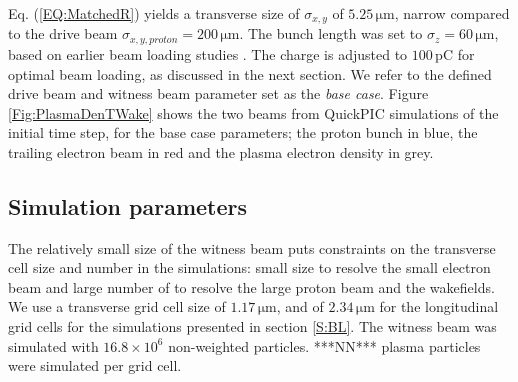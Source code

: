 \documentclass[aps,prstab,reprint,amsmath,amssymb,groupedaddress,onecolumn]{revtex4-1}
\newcommand{\unit}[1]{\,\mathrm{#1}}
\newcommand{\nexp}[1]{\times 10^{#1}}
\begin{document}
Eq. (\ref{EQ:MatchedR}) yields a transverse size of $\sigma_{x,y}$ of $5.25\unit{\mu m}$, narrow compared to the drive beam $\sigma_{x,y,proton} = 200\unit{\mu m}$.   The bunch length was set to $\sigma_{z}=60\unit{\mu m}$, based on earlier %
beam loading studies \cite{berglyd_olsen:2016}.  The charge %
is adjusted to $100\unit{pC}$ for optimal beam loading, as discussed in the next section. We refer to the defined drive beam and witness beam parameter set as the \emph{base case}.  
Figure \ref{Fig:PlasmaDenTWake} shows the two beams from QuickPIC simulations of the initial time step, for the base case parameters; the proton bunch in blue, the trailing electron beam in red and the plasma electron density in grey. 



\subsection{Simulation parameters}\label{SIM}

The relatively small size of the witness beam %
puts constraints on the transverse cell size and number in the simulations: small size to resolve the small electron beam and large number of to resolve the large proton beam and the wakefields. %
We use %
a transverse grid cell size of $1.17\unit{\mu m}$, and of
$2.34\unit{\mu m}$ for the longitudinal grid cells for the simulations presented in section \ref{S:BL}. The witness beam
was simulated with $16.8\nexp{6}$ non-weighted particles.  ***NN*** plasma particles were simulated per grid cell.
\end{document}
